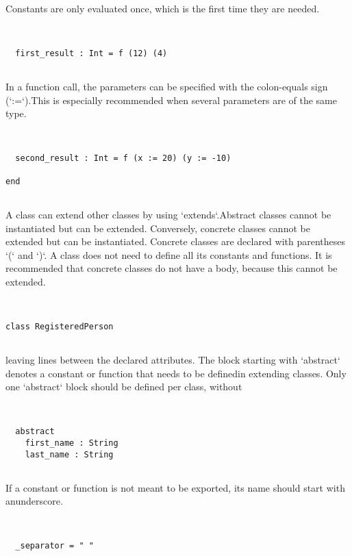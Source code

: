 \documentclass[12pt,a4paper]{article}
\begin{document}
Constants are only evaluated once, which is the first time they are needed. 


\begin{lstlisting}


  first_result : Int = f (12) (4)


\end{lstlisting}

In a function call, the parameters can be specified with the colon-equals sign (`:=`).This is especially recommended when several parameters are of the same type. 


\begin{lstlisting}


  second_result : Int = f (x := 20) (y := -10)

end


\end{lstlisting}

A class can extend other classes by using `extends`.Abstract classes cannot be instantiated but can be extended.
Conversely, concrete classes cannot be extended but can be instantiated.
Concrete classes are declared with parentheses `(` and `)`.
A class does not need to define all its constants and functions. It is recommended that concrete classes do not have a body, because this cannot be extended.


\begin{lstlisting}


class RegisteredPerson


\end{lstlisting}

leaving lines between the declared attributes. The block starting with `abstract` denotes a constant or function that needs to be definedin extending classes. Only one `abstract` block should be defined per class, without


\begin{lstlisting}


  abstract
    first_name : String
    last_name : String


\end{lstlisting}

If a constant or function is not meant to be exported, its name should start with anunderscore. 


\begin{lstlisting}


  _separator = " "


\end{lstlisting}
\end{document}
